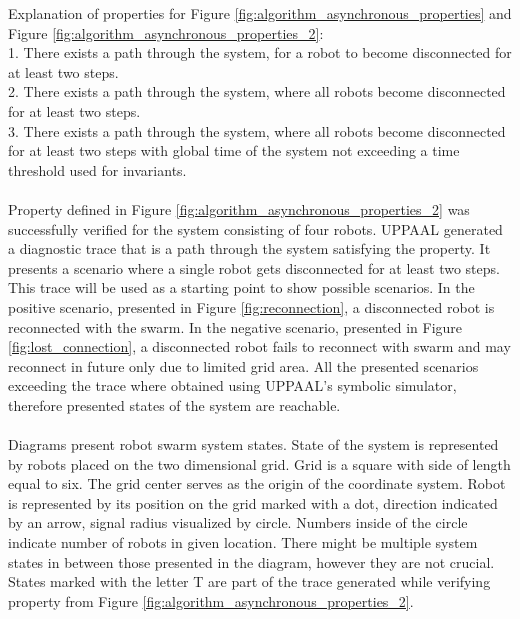 \noindent
Explanation of properties for Figure \ref{fig:algorithm_asynchronous_properties} and Figure \ref{fig:algorithm_asynchronous_properties_2}:\\
1. There exists a path through the system, for a robot to become disconnected for at least two steps.\\
2. There exists a path through the system, where all robots become disconnected for at least two steps.\\
3. There exists a path through the system, where all robots become disconnected for at least two steps with global time of the system not exceeding a time threshold used for invariants.\\
\\
Property defined in Figure \ref{fig:algorithm_asynchronous_properties_2} was successfully verified for the system consisting of four robots. UPPAAL generated a diagnostic trace that is a path through the system satisfying the property. It presents a scenario where a single robot gets disconnected for at least two steps. This trace will be used as a starting point to show possible scenarios. In the positive scenario, presented in Figure \ref{fig:reconnection}, a disconnected robot is reconnected with the swarm. In the negative scenario, presented in Figure \ref{fig:lost_connection}, a disconnected robot fails to reconnect with swarm and may reconnect in future only due to limited grid area. All the presented scenarios exceeding the trace where obtained using UPPAAL's symbolic simulator, therefore presented states of the system are reachable.\\
\\
Diagrams present robot swarm system states. State of the system is represented by robots placed on the two dimensional grid. Grid is a square with side of length equal to six. The grid center serves as the origin of the coordinate system. Robot is represented by its position on the grid marked with a dot, direction indicated by an arrow, signal radius visualized by circle. Numbers inside of the circle indicate number of robots in given location. There might be multiple system states in between those presented in the diagram, however they are not crucial. States marked with the letter T are part of the trace generated while verifying property from Figure \ref{fig:algorithm_asynchronous_properties_2}.

